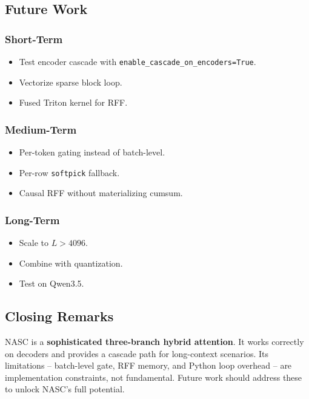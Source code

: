 \subsection{Future Work}

\subsubsection{Short-Term}

\begin{itemize}
\item Test encoder cascade with \texttt{enable\_cascade\_on\_encoders=True}.
\item Vectorize sparse block loop.
\item Fused Triton kernel for RFF.

\end{itemize}
\subsubsection{Medium-Term}

\begin{itemize}
\item Per-token gating instead of batch-level.
\item Per-row \texttt{softpick} fallback.
\item Causal RFF without materializing cumsum.

\end{itemize}
\subsubsection{Long-Term}

\begin{itemize}
\item Scale to $L > 4096$.
\item Combine with quantization.
\item Test on Qwen3.5.

\end{itemize}
\subsection{Closing Remarks}

NASC is a \textbf{sophisticated three-branch hybrid attention}. It works 
correctly on decoders and provides a cascade path for long-context 
scenarios. Its limitations -- batch-level gate, RFF memory, and Python loop 
overhead -- are implementation constraints, not fundamental. Future work 
should address these to unlock NASC's full potential.

